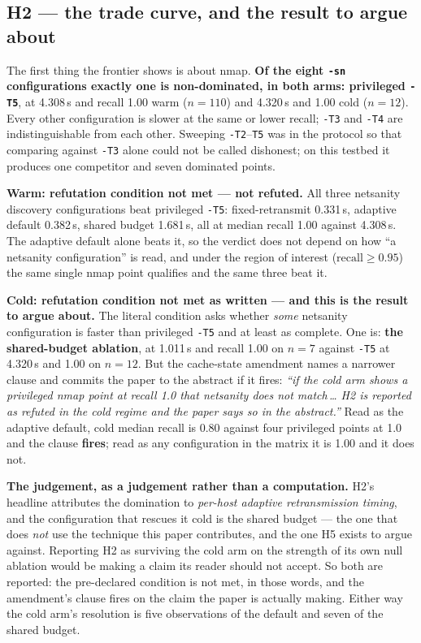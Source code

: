 \documentclass[conference]{IEEEtran}
\newcommand{\netsanity}{\textsf{netsanity}}
\newcommand{\NotRefuted}{not refuted}
\begin{document}
\subsection{H2 --- the trade curve, and the result to argue about}
\label{sec:h2}

The first thing the frontier shows is about nmap. \textbf{Of the eight
\texttt{-sn} configurations exactly one is non-dominated, in both arms:
privileged \texttt{-T5}}, at 4.308\,s and recall 1.00 warm ($n=110$) and
4.320\,s and 1.00 cold ($n=12$). Every other configuration is slower at the
same or lower recall; \texttt{-T3} and \texttt{-T4} are indistinguishable from
each other. Sweeping \texttt{-T2}--\texttt{T5} was in the protocol so that
comparing against \texttt{-T3} alone could not be called dishonest; on this
testbed it produces one competitor and seven dominated points.

\textbf{Warm: refutation condition not met --- \NotRefuted{}.} All three
\netsanity{} discovery configurations beat privileged \texttt{-T5}:
fixed-retransmit 0.331\,s, adaptive default 0.382\,s, shared budget 1.681\,s,
all at median recall 1.00 against 4.308\,s. The adaptive default alone beats
it, so the verdict does not depend on how ``a \netsanity{} configuration'' is
read, and under the region of interest ($\mathrm{recall}\ge0.95$) the same
single nmap point qualifies and the same three beat it.

\textbf{Cold: refutation condition not met as written --- and this is the
result to argue about.} The literal condition asks whether \emph{some}
\netsanity{} configuration is faster than privileged \texttt{-T5} and at least
as complete. One is: \textbf{the shared-budget ablation}, at 1.011\,s and
recall 1.00 on $n=7$ against \texttt{-T5} at 4.320\,s and 1.00 on $n=12$. But
the cache-state amendment names a narrower clause and commits the paper to the
abstract if it fires: \emph{``if the cold arm shows a privileged nmap point at
recall 1.0 that \netsanity{} does not match\,\ldots{} H2 is reported as refuted
in the cold regime and the paper says so in the abstract.''} Read as the
adaptive default, cold median recall is 0.80 against four privileged points at
1.0 and the clause \textbf{fires}; read as any configuration in the matrix it
is 1.00 and it does not.

\textbf{The judgement, as a judgement rather than a computation.} H2's headline
attributes the domination to \emph{per-host adaptive retransmission timing},
and the configuration that rescues it cold is the shared budget --- the one
that does \emph{not} use the technique this paper contributes, and the one H5
exists to argue against. Reporting H2 as surviving the cold arm on the strength
of its own null ablation would be making a claim its reader should not accept.
So both are reported: the pre-declared condition is not met, in those words,
and the amendment's clause fires on the claim the paper is actually making.
Either way the cold arm's resolution is five observations of the default and
seven of the shared budget.
\end{document}
